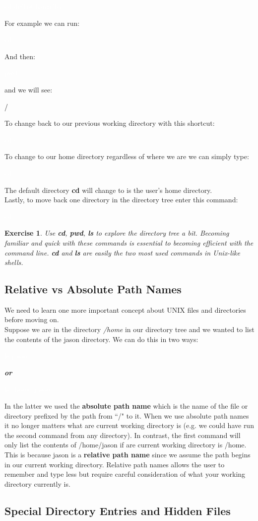 \documentclass[oneside]{book}
\newcommand{\commandline}[1]{\begin{center} \colorbox{Dark}{\textcolor{white}{#1}} \end{center}}
\newcommand{\exampleout}[1]{\begin{center} \colorbox{Light}{\textcolor{black}{#1}} \end{center}}
\newtheorem{ex}{Exercise}[chapter]
\begin{document}
\commandline{cd dirToChangeTo}
For example we can run:
\commandline{cd /}
And then:
\commandline{pwd}
and we will see:
\exampleout{/}
To change back to our previous working directory with this shortcut:
\commandline{cd -}
To change to our home directory regardless of where we are we can simply type:
\commandline{cd}
The default directory \textbf{cd} will change to is the user's home directory. \\
Lastly, to move back one directory in the directory tree enter this command:
\commandline{cd ../}

\begin{ex}
	Use \textbf{cd}, \textbf{pwd}, \textbf{ls} to explore the directory tree a bit. Becoming familiar and quick with these commands is essential to becoming efficient with the command line. \textbf{cd} and \textbf{ls} are easily the two most used commands in Unix-like shells.
\end{ex}

\subsection{Relative vs Absolute Path Names}
We need to learn one more important concept about UNIX files and directories before moving on. \\
Suppose we are in the directory \textit{/home} in our directory tree and we wanted to list the contents of the jason directory. We can do this in two ways:
\newpage
\commandline{ls jason}
\begin{center}
    \textbf{\textit{or}}
\end{center}
\commandline{ls /home/jason}
In the latter we used the \textbf{absolute path name} which is the name of the file or directory prefixed by the path from ``/" to it. When we use absolute path names it no longer matters what are current working directory is (e.g. we could have run the second command from any directory). In contrast, the first command will only list the contents of /home/jason if are current working directory is /home. This is because jason is a \textbf{relative path name} since we assume the path begins in our current working directory. Relative path names allows the user to remember and type less but require careful consideration of what your working directory currently is. 

\subsection{Special Directory Entries and Hidden Files}
\end{document}
